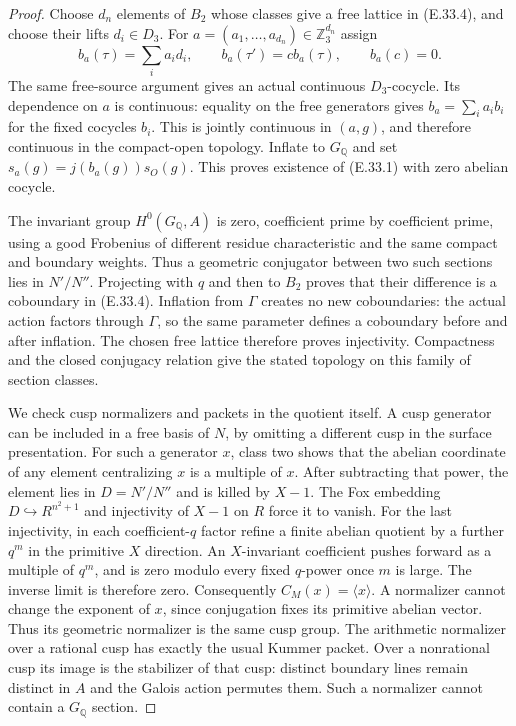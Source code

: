 \documentclass[11pt,oneside]{article}
\begin{document}
\begin{proof}
Choose $d_n$ elements of $B_2$ whose classes
give a free lattice in (E.33.4), and choose
their lifts $d_i\in D_3$. For
$a=(a_1,\ldots,a_{d_n})\in\mathbb Z_3^{d_n}$
assign
\[
 b_a(\tau)=\sum_i a_i d_i,\qquad
 b_a(\tau')=c b_a(\tau),\qquad b_a(c)=0.
 \tag{E.33.6}
\]
The same free-source argument gives an actual
continuous $D_3$-cocycle. Its dependence on $a$
is continuous: equality on the free generators
gives $b_a=\sum_i a_i b_i$ for the fixed cocycles
$b_i$. This is jointly continuous in $(a,g)$,
and therefore continuous in the compact-open
topology. Inflate to $G_{\mathbb Q}$
and set $s_a(g)=j(b_a(g))s_O(g)$. This proves
existence of (E.33.1) with zero abelian cocycle.

The invariant group $H^0(G_{\mathbb Q},A)$ is
zero, coefficient prime by coefficient prime,
using a good Frobenius of different residue
characteristic and the same compact and
boundary weights. Thus a geometric conjugator
between two such sections lies in $N'/N''$.
Projecting with $q$ and then to $B_2$ proves
that their difference is a coboundary in
(E.33.4). Inflation from $\Gamma$ creates no
new coboundaries: the actual action factors
through $\Gamma$, so the same parameter
defines a coboundary before and after
inflation. The chosen free lattice therefore
proves injectivity. Compactness and the
closed conjugacy relation give the stated
topology on this family of section classes.

We check cusp normalizers and packets in the
quotient itself. A cusp generator can be
included in a free basis of $N$, by omitting
a different cusp in the surface presentation.
For such a generator $x$, class two shows
that the abelian coordinate of any element
centralizing $x$ is a multiple of $x$.
After subtracting that power, the element
lies in $D=N'/N''$ and is killed by $X-1$.
The Fox embedding $D\hookrightarrow R^{n^2+1}$
and injectivity of $X-1$ on $R$ force it
to vanish. For the last injectivity, in each
coefficient-$q$ factor refine a finite
abelian quotient by a further $q^m$ in the
primitive $X$ direction. An $X$-invariant
coefficient pushes forward as a multiple
of $q^m$, and is zero modulo every fixed
$q$-power once $m$ is large. The inverse
limit is therefore zero. Consequently
$C_M(x)=\langle x\rangle$. A normalizer
cannot change the exponent of $x$, since
conjugation fixes its primitive abelian
vector. Thus its geometric normalizer is
the same cusp group. The arithmetic
normalizer over a rational cusp has
exactly the usual Kummer packet. Over a
nonrational cusp its image is the
stabilizer of that cusp: distinct boundary
lines remain distinct in $A$ and the
Galois action permutes them. Such a
normalizer cannot contain a $G_{\mathbb Q}$
section.


\end{proof}
\end{document}
